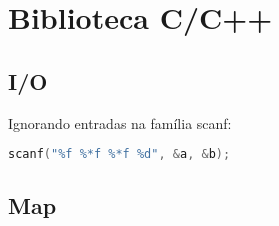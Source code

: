 \documentclass[a4paper,twocolumn, 10pt, landscape]{article}
\begin{document}
\section{Biblioteca C/C++}
\subsection{I/O}
Ignorando entradas na família scanf:
\begin{lstlisting}[language=c, label=cio, caption={Ignora os dois floats do meio. Retornará 2 no sucesso.}]
 scanf("%f %*f %*f %d", &a, &b);
\end{lstlisting}


\subsection{Map}

\end{document}
